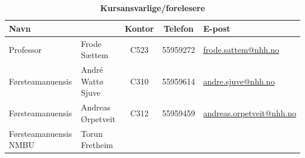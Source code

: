 
\thispagestyle{bed3}
\begin{flushright}
        \vspace*{-1cm}
        \universityname  \\[0.5em]
        \vspace{1cm}
        \textsc{\small \casenumber}  \\ %
    \end{flushright}

\vspace{1.5cm}

\begin{flushleft}
        \vspace{-4em} %
        \vspace{0.5cm}
        \textbf{\Large \doctitle} \\[0.75em]
        \textsc{\large \docsubtitle} \\

    \end{flushleft}

\vspace{2cm}

\begin{table}[htbp!]
\centering
\captionsetup{singlelinecheck=false}
\caption*{\textbf{\large Kursansvarlige/forelesere}}
\begin{tabularx}{\textwidth}{l l c c l}
\toprule
\multicolumn{2}{l}{Navn} &  Kontor & Telefon & E-post \\
\midrule
Professor & Frode Sættem & C523 & 55959272 & \href{mailto:frode.saettem@nhh.no}{frode.sattem@nhh.no}
\\
Førsteamanuensis & André Wattø Sjuve & C310 & 55959614 & \href{mailto:andre.sjuve@nhh.no}{andre.sjuve@nhh.no}
\\
Førsteamanuensis & Andreas Ørpetveit & C312 &  55959459 & \href{mailto:andreas.orpetveit@nhh.no}{andreas.orpetveit@nhh.no}
\\
Førsteamanuensis NMBU & Torun Fretheim & & \\
\bottomrule
\end{tabularx}
\end{table}

